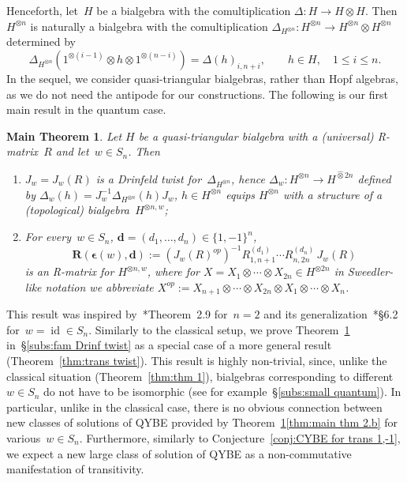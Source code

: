 \documentclass[12pt, reqno]{amsart}
\newtheorem{mthm}[theorem]{Main Theorem}
\theoremstyle{definition}
\numberwithin{equation}{section}
\newcommand{\tensor}{\otimes}
\newenvironment{enumalph}{\begin{enumerate}[label={\rm(\alph*)},leftmargin=*]}{\end{enumerate}}
\DeclareMathOperator{\id}{id}
\newcommand{\sgna}[1]{\boldsymbol{\epsilon}(#1)}
\begin{document}
Henceforth, let~$H$ be a bialgebra with the comultiplication $\Delta:H\to H\tensor H$. Then~$H^{\tensor n}$ is naturally a 
bialgebra with the comultiplication 
$\Delta_{H^{\tensor n}}:H^{\tensor n}\to H^{\tensor n}\tensor H^{\tensor n}$ determined by 
$$
\Delta_{H^{\tensor n}}(1^{\tensor(i-1)}\tensor h
\tensor 1^{\tensor (n-i)})=\Delta(h)_{i,n+i},\qquad h\in H,\quad 
1\le i\le n.
$$
In the sequel, we consider quasi-triangular bialgebras, rather than Hopf algebras, as we do not need the antipode for our constructions.
The following is our first main result in the quantum case.
\begin{mthm}\label{thm:main thm 2}
Let $H$ be a quasi-triangular bialgebra 
with a (universal) R-matrix~$R$ and
let~$w\in S_n$. Then
\begin{enumalph}
\item\label{thm:main thm 2.a}
$J_w=J_w(R)$ is a Drinfeld twist for~$\Delta_{H^{\tensor n}}$, hence
$\Delta_w:H^{\tensor n}\to H^{\widehat\tensor 2n}$ defined by
$\Delta_w(h)=J_w^{-1}\Delta_{H^{\tensor n}}(h)J_w$, $h\in H^{\tensor n}$
equips 
 $H^{\tensor n}$ with a structure 
 of a (topological) bialgebra~$H^{\tensor n,w}$;
 \item\label{thm:main thm 2.b}
 For every~$w\in S_n$, $\boldsymbol{d}=(d_1,\dots,d_n)\in\{1,-1\}^n$, 
 $$\mathbf R(\sgna{w},\boldsymbol d):=(J_w(R)^{op})^{-1} R_{1,n+1}^{(d_1)}\cdots R_{n,2n}^{(d_n)}\, J_w(R)
$$
is an R-matrix for $H^{\tensor n,w}$, where for
$X=X_1\tensor\cdots\tensor X_{2n}\in H^{\tensor 2n}$
in Sweedler-like notation we abbreviate $X^{op}:=X_{n+1}\tensor \cdots\tensor X_{2n}
\tensor X_1\tensor\cdots\tensor X_n
$.
\end{enumalph}
 \end{mthm}
This result was inspired by~\cite{RSTS}*{Theorem~2.9}
for~$n=2$ and its generalization~\cite{Mou}*{\S6.2}
for~$w=\id\in S_n$.
Similarly to the classical setup, we prove Theorem~\ref{thm:main thm 2} in~\S\ref{subs:fam Drinf twist} as a special case of a more general result (Theorem~\ref{thm:trans twist}).
This result is highly non-trivial,  since, unlike
the classical situation (Theorem~\ref{thm:thm 1}),
bialgebras corresponding to different $w\in S_n$
do not have to be isomorphic (see for example~\S\ref{subs:small quantum}). In particular, unlike
in the classical case,
there is no obvious connection between new classes of solutions of QYBE
provided by Theorem~\ref{thm:main thm 2}\ref{thm:main thm 2.b} for various~$w\in S_n$.
Furthermore, similarly to Conjecture~\ref{conj:CYBE for trans 1,-1}, we expect a new large class of solution of QYBE as a non-commutative manifestation of transitivity.
\end{document}
